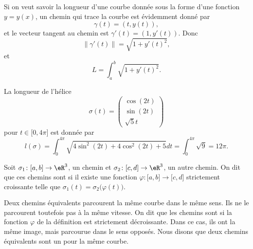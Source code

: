 \begin{normaltext}
	Si on veut savoir la longueur d'une courbe donnée sous la forme d'une fonction \( y=y(x)\), un chemin qui trace la courbe est évidemment donné par
	\begin{equation}
		\gamma(t)=(t,y(t)),
	\end{equation}
	et le vecteur tangent au chemin est \( \gamma'(t)=(1,y'(t))\). Donc
	\begin{equation}
		\| \gamma'(t) \|=\sqrt{1+y'(t)^2},
	\end{equation}
	et
	\begin{equation} \label{EqLongFonction}
		L=\int_a^b\sqrt{1+y'(t)^2}.
	\end{equation}
\end{normaltext}

\begin{example}
	La longueur de l'hélice
	\begin{equation}
		\sigma(t)=\begin{pmatrix}
			\cos(2t) \\
			\sin(2t) \\
			\sqrt{5}t
		\end{pmatrix}
	\end{equation}
	pour \( t\in\mathopen[ 0 , 4\pi \mathclose]\) est donnée par
	\begin{equation}
		l(\sigma)=\int_0^{4\pi}\sqrt{4\sin^2(2t)+4\cos^2(2t)+5}dt=\int_0^{4\pi}\sqrt{9}=12\pi.
	\end{equation}
\end{example}

\begin{definition}
	Soit \( \sigma_1\colon \mathopen[ a , b \mathclose]\to \eR^3\), un chemin et \( \sigma_2\colon \mathopen[ c , d \mathclose]\to \eR^3\), un autre chemin. On dit que ces chemins sont  si il existe une fonction \( \varphi\colon \mathopen[ a , b \mathclose]\to \mathopen[ c , d \mathclose]\) strictement croissante telle que \( \sigma_1(t)=\sigma_2\big( \varphi(t) \big)\).
\end{definition}

Deux chemins équivalents parcourent la même courbe dans le même sens. Ils ne le parcourent toutefois pas à la même vitesse. On dit que les chemins sont  si la fonction \( \varphi\) de la définition est strictement décroissante. Dans ce cas, ils ont la même image, mais parcourue dans le sens opposés. Nous disons que deux chemins équivalents sont un  pour la même courbe.

